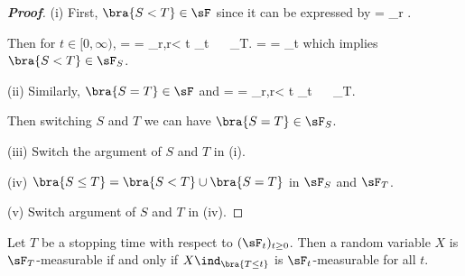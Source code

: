 \begin{proof}[\bf Proof]
\ben
\item [(i)] First, $\bra{S<T}\in \sF$ since it can be expressed by
\be
{} = \bigcup_{r\in \Q} .
\ee

Then for $t\in [0,\infty)$,
\be
{} \cap {} =  = \bigcup_{r\in \Q,r< t} \cap {} \in \sF_t \ \ra \   \in \sF_T.
\ee
\be
{} \cap {} =   \cup {} =  \cup {} \in \sF_t \nonumber
\ee
which implies $\bra{S<T}  \in \sF_S$.

\item [(ii)] Similarly, $\bra{S=T}\in \sF$ and
\be
{}\cap {} =  = \bigcup_{r\in \Q,r< t} \cap {} \in \sF_t \ \ra \   \in \sF_T.
\ee

Then switching $S$ and $T$ we can have $\bra{S=T}  \in \sF_S$.

\item [(iii)] Switch the argument of $S$ and $T$ in (i).

\item [(iv)] $\bra{S\leq T} = \bra{S<T}\cup\bra{S=T}$ in $\sF_S$ and $\sF_T$.
\item [(v)] Switch argument of $S$ and $T$ in (iv).
\een
\end{proof}


\begin{proposition}\label{pro:random_variable_stopping_time_measurable}
Let $T$ be a stopping time with respect to $(\sF_t)_{t\geq 0}$. Then a random variable $X$ is $\sF_T$-measurable if and only if $X\ind_{\bra{T \leq t}}$ is $\sF_t$-measurable for all $t$.
\end{proposition}

